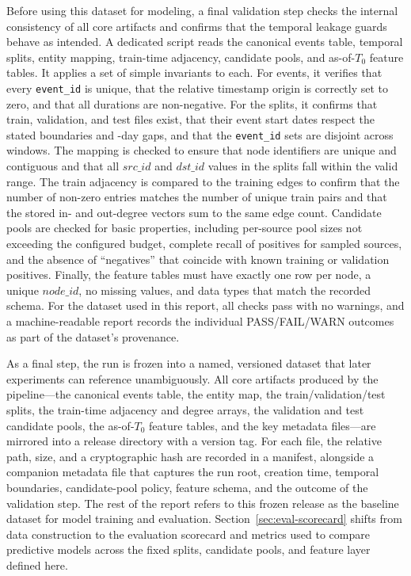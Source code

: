 Before using this dataset for modeling, a final validation step checks the internal consistency of all core artifacts and confirms that the temporal leakage guards behave as intended. A dedicated script reads the canonical events table, temporal splits, entity mapping, train-time adjacency, candidate pools, and as-of-\(T_0\) feature tables. It applies a set of simple invariants to each. For events, it verifies that every \texttt{event\_id} is unique, that the relative timestamp origin is correctly set to zero, and that all durations are non-negative. For the splits, it confirms that train, validation, and test files exist, that their event start dates respect the stated boundaries and \InterSplitGap-day gaps, and that the \texttt{event\_id} sets are disjoint across windows. The mapping is checked to ensure that node identifiers are unique and contiguous and that all \(\mathit{src\_id}\) and \(\mathit{dst\_id}\) values in the splits fall within the valid range. The train adjacency is compared to the training edges to confirm that the number of non-zero entries matches the number of unique train pairs and that the stored in- and out-degree vectors sum to the same edge count. Candidate pools are checked for basic properties, including per-source pool sizes not exceeding the configured budget, complete recall of positives for sampled sources, and the absence of ``negatives'' that coincide with known training or validation positives. Finally, the feature tables must have exactly one row per node, a unique \(\mathit{node\_id}\), no missing values, and data types that match the recorded schema. For the dataset used in this report, all checks pass with no warnings, and a machine-readable report records the individual PASS/FAIL/WARN outcomes as part of the dataset's provenance.

As a final step, the run is frozen into a named, versioned dataset that later experiments can reference unambiguously. All core artifacts produced by the pipeline---the canonical events table, the entity map, the train/validation/test splits, the train-time adjacency and degree arrays, the validation and test candidate pools, the as-of-\(T_0\) feature tables, and the key metadata files---are mirrored into a release directory with a version tag. For each file, the relative path, size, and a cryptographic hash are recorded in a manifest, alongside a companion metadata file that captures the run root, creation time, temporal boundaries, candidate-pool policy, feature schema, and the outcome of the validation step. The rest of the report refers to this frozen release as the baseline dataset for model training and evaluation. Section~\ref{sec:eval-scorecard} shifts from data construction to the evaluation scorecard and metrics used to compare predictive models across the fixed splits, candidate pools, and feature layer defined here.

